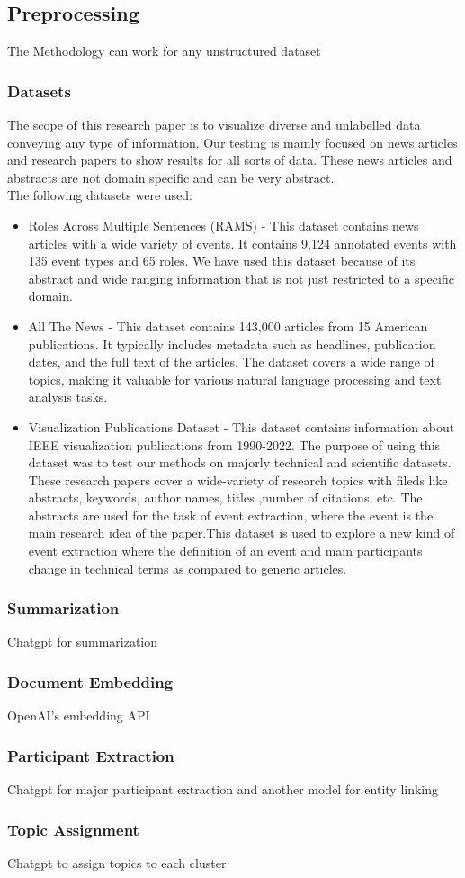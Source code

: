 \subsection{Preprocessing}
The Methodology can work for any unstructured dataset
\subsubsection{Datasets}
The scope of this research paper is to visualize diverse and unlabelled data conveying any type of information. Our testing is mainly focused on news articles and research papers to show results for all sorts of data. These news articles and abstracts are not domain specific and can be very abstract. \\
The following datasets were used:
\begin{itemize}
    \item Roles Across Multiple Sentences (RAMS) - This dataset contains news articles with a wide variety of events. It contains 9,124 annotated events with 135 event types and 65 roles. We have used this dataset because of its abstract and wide ranging information that is not just restricted to a specific domain. 
    \item All The News - This dataset contains 143,000 articles from 15 American publications.  It typically includes metadata such as headlines, publication dates, and the full text of the articles. The dataset covers a wide range of topics, making it valuable for various natural language processing and text analysis tasks.
    \item Visualization Publications Dataset - This dataset contains information about IEEE visualization publications from 1990-2022. The purpose of using this dataset was to test our methods on majorly technical and scientific datasets. These research papers cover a wide-variety of research topics with fileds like abstracts, keywords, author names, titles ,number of citations, etc. The abstracts are used for the task of event extraction, where the event is the main research idea of the paper.This dataset is used to explore a new kind of event extraction where the definition of an event and main participants change in technical terms as compared to generic articles.
\end{itemize}
\subsubsection{Summarization}
Chatgpt for summarization
\subsubsection{Document Embedding}\label{sec: embeddings}
OpenAI's embedding API
\subsubsection{Participant Extraction}\label{sec: participant_extraction}
Chatgpt for major participant extraction and another model for entity linking

\subsubsection{Topic Assignment}\label{sec: tag_assignment}
Chatgpt to assign topics to each cluster
